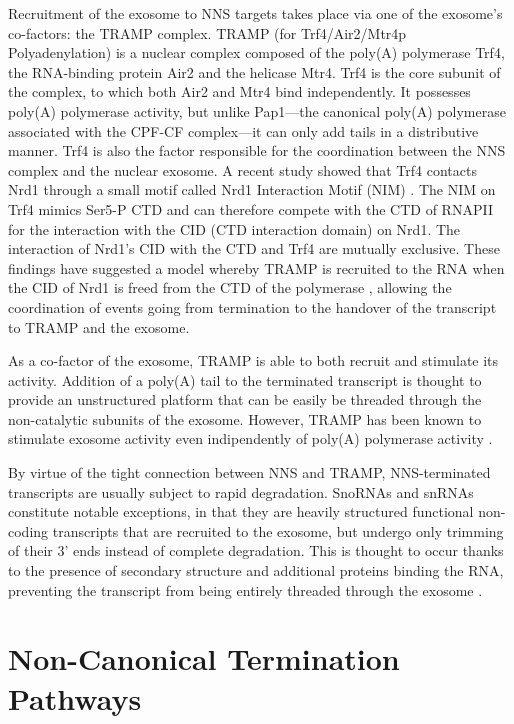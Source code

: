 Recruitment of the exosome to NNS targets takes place via one of the exosome’s co-factors: the TRAMP complex. 
TRAMP (for Trf4/Air2/Mtr4p Polyadenylation) is a nuclear complex composed of the poly(A) polymerase Trf4, the RNA-binding protein Air2 and the helicase Mtr4. 
Trf4 is the core subunit of the complex, to which both Air2 and Mtr4 bind independently. 
It possesses poly(A) polymerase activity, but unlike Pap1---the canonical poly(A) polymerase associated with the CPF-CF complex---it can only add tails in a distributive manner. 
Trf4 is also the factor responsible for the coordination between the NNS complex and the nuclear exosome. 
A recent study showed that Trf4 contacts Nrd1 through a small motif called Nrd1 Interaction Motif (NIM) . 
The NIM on Trf4 mimics Ser5-P CTD and can therefore compete with the CTD of RNAPII for the interaction with the CID (CTD interaction domain) on Nrd1. 
The interaction of Nrd1’s CID with the CTD and Trf4 are mutually exclusive. 
These findings have suggested a model whereby TRAMP is recruited to the RNA when the CID of Nrd1 is freed from the CTD of the polymerase \cite{tudek:2014:molecular}, allowing the coordination of events going from termination to the handover of the transcript to TRAMP and the exosome.

As a co-factor of the exosome, TRAMP is able to both recruit and stimulate its activity. 
Addition of a poly(A) tail to the terminated transcript is thought to provide an unstructured platform that can be easily be threaded through the non-catalytic subunits of the exosome. 
However, TRAMP has been known to stimulate exosome activity even indipendently of poly(A) polymerase activity \cite{tudek:2014:molecular}. 

By virtue of the tight connection between NNS and TRAMP, NNS-terminated transcripts are usually subject to rapid degradation. SnoRNAs and snRNAs constitute notable exceptions, in that they are heavily structured functional non-coding transcripts that are recruited to the exosome, but undergo only trimming of their 3’ ends instead of complete degradation. This is thought to occur thanks to the presence of secondary structure and additional proteins binding the RNA, preventing the transcript from being entirely threaded through the exosome \cite{mitchell:1997:exosome}.


\section{Non-Canonical Termination Pathways}

